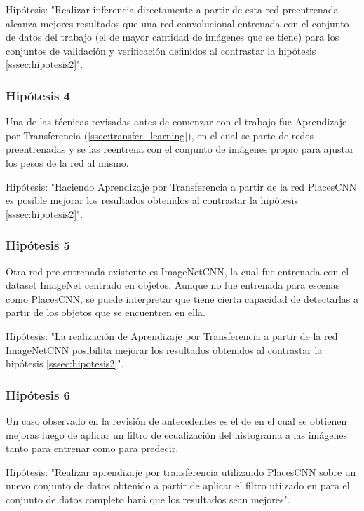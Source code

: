 Hipótesis: "Realizar inferencia directamente a partir de esta red preentrenada alcanza mejores resultados que una red convolucional entrenada con el conjunto de datos del trabajo \cite{vision_based_real_estate_price_estimation} (el de mayor cantidad de imágenes que se tiene) para los conjuntos de validación y verificación definidos al contrastar la hipótesis \ref{sssec:hipotesis2}".

\subsubsection{Hipótesis 4} \label{sssec:hipotesis4}
Una de las técnicas revisadas antes de comenzar con el trabajo fue Aprendizaje por Transferencia (\ref{ssec:transfer_learning}), en el cual se parte de redes preentrenadas y se las reentrena con el conjunto de imágenes propio para ajustar los pesos de la red al mismo. 

Hipótesis: "Haciendo Aprendizaje por Transferencia a partir de la red PlacesCNN es posible mejorar los resultados obtenidos al contrastar la hipótesis \ref{sssec:hipotesis2}".


\subsubsection{Hipótesis 5} \label{sssec:hipotesis5}
Otra red pre-entrenada existente es ImageNetCNN, la cual fue entrenada con el dataset ImageNet centrado en objetos. Aunque no fue entrenada para escenas como PlacesCNN, se puede interpretar que tiene cierta capacidad de detectarlas a partir de los objetos que se encuentren en ella. 

Hipótesis: "La realización de Aprendizaje por Transferencia a partir de la red ImageNetCNN posibilita mejorar los resultados obtenidos al contrastar la hipótesis \ref{sssec:hipotesis2}".

\subsubsection{Hipótesis 6} \label{sssec:hipotesis6}
Un caso observado en la revisión de antecedentes es el de \cite{lstm_real_estate} en el cual se obtienen mejoras luego de aplicar un filtro de ecualización del histograma a las imágenes tanto para entrenar como para predecir. 

Hipótesis: "Realizar aprendizaje por transferencia utilizando PlacesCNN sobre un nuevo conjunto de datos obtenido a partir de aplicar el filtro utiizado en \cite{lstm_real_estate} para el conjunto de datos completo hará que los resultados sean mejores".


